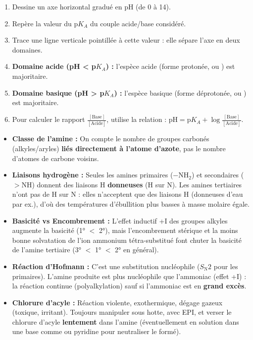 \documentclass[11pt]{article}
\begin{document}
\begin{methode}
\begin{enumerate}
\item Dessine un axe horizontal gradué en pH (de 0 à 14).
\item Repère la valeur du p$K_A$ du couple acide/base considéré.
\item Trace une ligne verticale pointillée à cette valeur : elle sépare l'axe en deux domaines.
\item \textbf{Domaine acide (pH < p$K_A$) :} l'espèce acide (forme protonée,  ou ) est majoritaire.
\item \textbf{Domaine basique (pH > p$K_A$) :} l'espèce basique (forme déprotonée,  ou ) est majoritaire.
\item Pour calculer le rapport $\frac{[\text{Base}]}{[\text{Acide}]}$, utilise la relation : $\text{pH} = \text{p}K_A + \log\frac{[\text{Base}]}{[\text{Acide}]}$.
\end{enumerate}
\end{methode}

\begin{attention}
\begin{itemize}
\item \textbf{Classe de l'amine :} On compte le nombre de groupes carbonés (alkyles/aryles) \textbf{liés directement à l'atome d'azote}, pas le nombre d'atomes de carbone voisins.
\item \textbf{Liaisons hydrogène :} Seules les amines primaires ($-$NH$_2$) et secondaires ($>$NH) donnent des liaisons H \textbf{donneuses} (H sur N). Les amines tertiaires n'ont pas de H sur N : elles n'acceptent que des liaisons H (donneuses d'eau par ex.), d'où des températures d'ébullition plus basses à masse molaire égale.
\item \textbf{Basicité vs Encombrement :} L'effet inductif +I des groupes alkyles augmente la basicité (1° $<$ 2°), mais l'encombrement stérique et la moins bonne solvatation de l'ion ammonium tétra-substitué font chuter la basicité de l'amine tertiaire (3° $<$ 1° $<$ 2° en général).
\item \textbf{Réaction d'Hofmann :} C'est une substitution nucléophile ($S_\text{N}2$ pour les primaires). L'amine produite est plus nucléophile que l'ammoniac (effet +I) : la réaction continue (polyalkylation) sauf si l'ammoniac est en \textbf{grand excès}.
\item \textbf{Chlorure d'acyle :} Réaction violente, exothermique, dégage  gazeux (toxique, irritant). Toujours manipuler sous hotte, avec EPI, et verser le chlorure d'acyle \textbf{lentement} dans l'amine (éventuellement en solution dans une base comme  ou pyridine pour neutraliser le  formé).
\end{itemize}
\end{attention}
\end{document}
